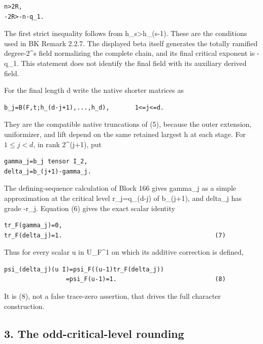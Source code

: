\begin{Verbatim}[fontsize=\small,breaklines=true,breakanywhere=true]
n>2R,
-2R>-n-q_1.
\end{Verbatim}

The first strict inequality follows from h\_s\textgreater h\_(s-1).
These are the conditions used in BK Remark 2.2.7. The displayed beta
itself generates the totally ramified degree-2\^{}s field normalizing
the complete chain, and its final critical exponent is -q\_1. This
statement does not identify the final field with its auxiliary derived
field.

For the final length d write the native shorter matrices as

\begin{Verbatim}[fontsize=\small,breaklines=true,breakanywhere=true]
b_j=B(F,t;h_(d-j+1),...,h_d),       1<=j<=d.
\end{Verbatim}

They are the compatible native truncations of (5), because the outer
extension, uniformizer, and lift depend on the same retained largest h
at each stage. For \(1\le j<d\), in rank 2\^{}(j+1), put

\begin{Verbatim}[fontsize=\small,breaklines=true,breakanywhere=true]
gamma_j=b_j tensor I_2,
delta_j=b_(j+1)-gamma_j.
\end{Verbatim}

The defining-sequence calculation of Block 166 gives gamma\_j as a simple
approximation at the critical level r\_j=q\_(d-j) of b\_(j+1), and
delta\_j has grade -r\_j. Equation (6) gives the exact scalar identity

\begin{Verbatim}[fontsize=\small,breaklines=true,breakanywhere=true]
tr_F(gamma_j)=0,
tr_F(delta_j)=1.                                          (7)
\end{Verbatim}

Thus for every scalar u in U\_F\^{}1 on which its additive correction is
defined,

\begin{Verbatim}[fontsize=\small,breaklines=true,breakanywhere=true]
psi_(delta_j)(u I)=psi_F((u-1)tr_F(delta_j))
                 =psi_F(u-1)=1.                           (8)
\end{Verbatim}

It is (8), not a false trace-zero assertion, that drives the full
character construction.

\hypertarget{dyadic_character-the-odd-critical-level-rounding}{%
\subsection{3. The odd-critical-level
rounding}\label{dyadic_character-the-odd-critical-level-rounding}}

